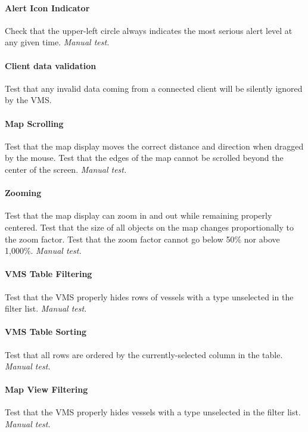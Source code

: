 \documentclass{article}
\begin{document}
\paragraph{Alert Icon Indicator \\}
Check that the upper-left circle always indicates the most serious alert level at any given time. \emph{Manual test.}

\paragraph{Client data validation \\}
Test that any invalid data coming from a connected client will be silently ignored by the VMS.

\paragraph{Map Scrolling \\}
Test that the map display moves the correct distance and direction when dragged by the mouse. Test that the edges of the map cannot be scrolled beyond the center of the screen. \emph{Manual test.}

\paragraph{Zooming \\}
Test that the map display can zoom in and out while remaining properly centered. Test that the size of all objects on the map changes proportionally to the zoom factor. Test that the zoom factor cannot go below 50\% nor above 1,000\%. \emph{Manual test.}

\paragraph{VMS Table Filtering \\}
Test that the VMS properly hides rows of vessels with a type unselected in the filter list. \emph{Manual test.}

\paragraph{VMS Table Sorting \\}
Test that all rows are ordered by the currently-selected column in the table. \emph{Manual test.}

\paragraph{Map View Filtering \\}
Test that the VMS properly hides vessels with a type unselected in the filter list. \emph{Manual test.}
\end{document}
